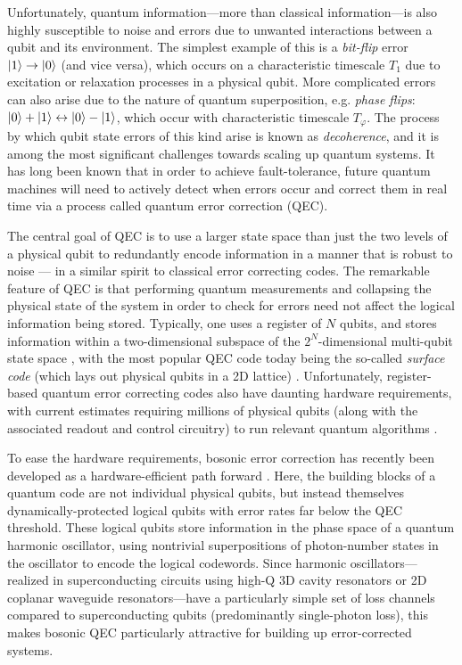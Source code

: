Unfortunately, quantum information---more than classical information---is also highly susceptible to noise and errors due to unwanted interactions between a qubit and its environment. The simplest example of this is a \textit{bit-flip} error $\lvert1\rangle \to \lvert0\rangle$ (and vice versa), which occurs on a characteristic timescale $T_1$ due to excitation or relaxation processes in a physical qubit. More complicated errors can also arise due to the nature of quantum superposition, e.g. \textit{phase flips}: $\lvert0\rangle + \lvert1\rangle \leftrightarrow \lvert0\rangle - \lvert1\rangle$, which occur with characteristic timescale $T_\varphi$. The process by which qubit state errors of this kind arise is known as \textit{decoherence}, and it is among the most significant challenges towards scaling up quantum systems. It has long been known that in order to achieve fault-tolerance, future quantum machines will need to actively detect when errors occur and correct them in real time via a process called quantum error correction (QEC). 

The central goal of QEC is to use a larger state space than just the two levels of a physical qubit to redundantly encode information in a manner that is robust to noise --- in a similar spirit to classical error correcting codes.
The remarkable feature of QEC is that performing quantum measurements and collapsing the physical state of the system in order to check for errors need not affect the logical information being stored. Typically, one uses a register of $N$ qubits, and stores information within a two-dimensional subspace of the $2^N$-dimensional multi-qubit state space \cite{shor1995scheme, steane1996error, gottesman1996class, kitaev2003fault, fowler2012surface}, with the most popular QEC code today being the so-called \textit{surface code} (which lays out physical qubits in a 2D lattice) \cite{fowler2012surface}. Unfortunately, register-based quantum error correcting codes also have daunting hardware requirements, with current estimates requiring millions of physical qubits (along with the associated readout and control circuitry) to run relevant quantum algorithms \cite{gidney2021factor}. 

To ease the hardware requirements, bosonic error correction has recently been developed as a hardware-efficient path forward \cite{terhal2020bosonic, cai2021bosonic, joshi2021bosonic}. Here, the building blocks of a quantum code are not individual physical qubits, but instead themselves dynamically-protected logical qubits with error rates far below the QEC threshold. These logical qubits store information in the phase space of a quantum harmonic oscillator, using nontrivial superpositions of photon-number states in the oscillator to encode the logical codewords. Since harmonic oscillators---realized in superconducting circuits using high-Q 3D cavity resonators or 2D coplanar waveguide resonators---have a particularly simple set of loss channels compared to superconducting qubits (predominantly single-photon loss), this makes bosonic QEC particularly attractive for building up error-corrected systems. 

